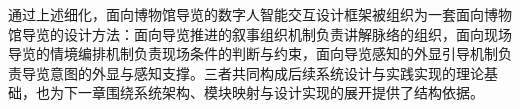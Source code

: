 通过上述细化，面向博物馆导览的数字人智能交互设计框架被组织为一套面向博物馆导览的设计方法：面向导览推进的叙事组织机制负责讲解脉络的组织，面向现场导览的情境编排机制负责现场条件的判断与约束，面向导览感知的外显引导机制负责导览意图的外显与感知支撑。三者共同构成后续系统设计与实践实现的理论基础，也为下一章围绕系统架构、模块映射与设计实现的展开提供了结构依据。
